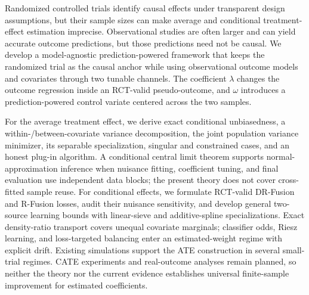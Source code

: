 Randomized controlled trials identify causal effects under transparent design assumptions, but their sample sizes can make average and conditional treatment-effect estimation imprecise. Observational studies are often larger and can yield accurate outcome predictions, but those predictions need not be causal. We develop a model-agnostic prediction-powered framework that keeps the randomized trial as the causal anchor while using observational outcome models and covariates through two tunable channels. The coefficient $\lambda$ changes the outcome regression inside an RCT-valid pseudo-outcome, and $\omega$ introduces a prediction-powered control variate centered across the two samples.

For the average treatment effect, we derive exact conditional unbiasedness, a within-/between-covariate variance decomposition, the joint population variance minimizer, its separable specialization, singular and constrained cases, and an honest plug-in algorithm. A conditional central limit theorem supports normal-approximation inference when nuisance fitting, coefficient tuning, and final evaluation use independent data blocks; the present theory does not cover cross-fitted sample reuse. For conditional effects, we formulate RCT-valid DR-Fusion and R-Fusion losses, audit their nuisance sensitivity, and develop general two-source learning bounds with linear-sieve and additive-spline specializations. Exact density-ratio transport covers unequal covariate marginals; classifier odds, Riesz learning, and loss-targeted balancing enter an estimated-weight regime with explicit drift. Existing simulations support the ATE construction in several small-trial regimes. CATE experiments and real-outcome analyses remain planned, so neither the theory nor the current evidence establishes universal finite-sample improvement for estimated coefficients.
